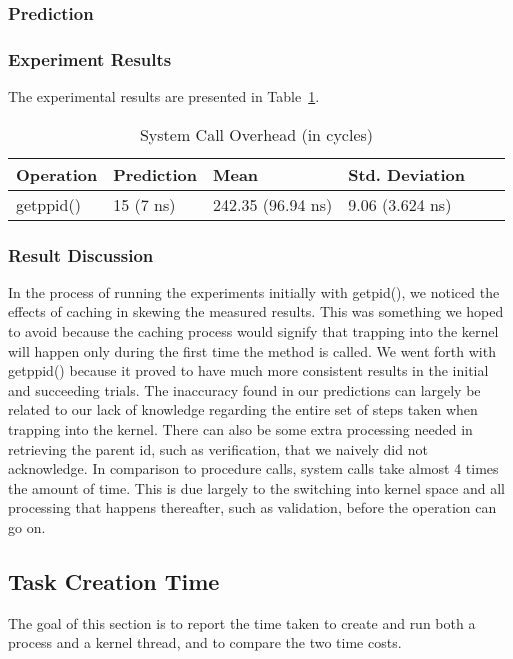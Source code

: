 \documentclass{article} %
\begin{document}
\subsubsection{Prediction}

\subsubsection{Experiment Results}
The experimental results are presented in Table~\ref{table:systemcall_overhead}.
\begin{table}
  \begin{center}
    \caption{System Call Overhead (in cycles)}
    \begin{tabular}{|l|l|l|l|l|l|}
      \hline
      Operation   & Prediction            & Mean                       & Std. Deviation     \\ \hline
      getppid()   & 15 (7 ns)             & 242.35 (96.94 ns)          & 9.06 (3.624 ns)    \\ \hline
    \end{tabular}
  \end{center}
  \label{table:systemcall_overhead}
\end{table}

\subsubsection{Result Discussion}
In the process of running the experiments initially with getpid(), we noticed the effects of caching in skewing the measured results. This was something we hoped to avoid because the caching process would signify that trapping into the kernel will happen only during the first time the method is called. We went forth with getppid() because it proved to have much more consistent results in the initial and succeeding trials. The inaccuracy found in our predictions can largely be related to our lack of knowledge regarding the entire set of steps taken when trapping into the kernel. There can also be some extra processing needed in retrieving the parent id, such as verification, that we naively did not acknowledge. In comparison to procedure calls, system calls take almost 4 times the amount of time. This is due largely to the switching into kernel space and all processing that happens thereafter, such as validation, before the operation can go on.

\subsection{Task Creation Time}
The goal of this section is to report the time taken to create and run both
a process and a kernel thread, and to compare the two time costs.
\end{document}
